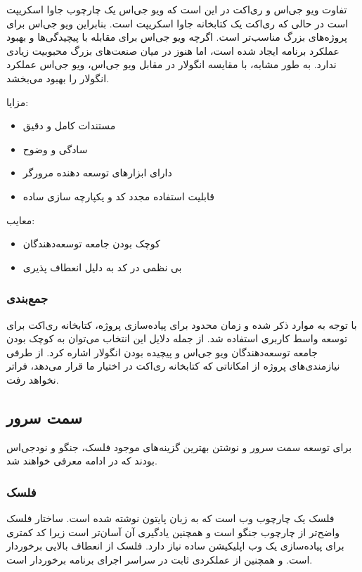 تفاوت ویو جی‌اس و ری‌اکت در این است که ویو جی‌اس یک چارچوب جاوا اسکریپت است در حالی که ری‌اکت یک کتابخانه جاوا اسکریپت است. بنابراین ویو جی‌اس برای پروژه‌های بزرگ مناسب‌تر است. اگرچه ویو جی‌اس برای مقابله با پیچیدگی‌ها و بهبود عملکرد برنامه ایجاد شده است، اما هنوز در میان صنعت‌های بزرگ محبوبیت زیادی ندارد. به طور مشابه، با مقایسه انگولار در مقابل ویو جی‌اس، ویو جی‌اس عملکرد انگولار را بهبود می‌بخشد.


مزایا:
\begin{itemize}
    \item مستندات کامل و دقیق
    \item سادگی و وضوح
    \item دارای ابزارهای توسعه دهنده مرورگر
    \item قابلیت استفاده مجدد کد و یکپارچه سازی ساده
\end{itemize}

معایب:

\begin{itemize}
    \item کوچک بودن جامعه توسعه‌دهندگان
    \item بی نظمی در کد به دلیل انعطاف پذیری 
\end{itemize}


\subsubsection{جمع‌بندی}

با توجه به موارد ذکر شده و زمان محدود برای پیاده‌سازی پروژه، کتابخانه ری‌اکت برای توسعه واسط کاربری استفاده شد. از جمله دلایل این انتخاب می‌توان به کوچک بودن جامعه توسعه‌دهندگان ویو جی‌اس و پیچیده بودن انگولار اشاره کرد. از طرفی نیازمندی‌های پروژه از امکاناتی که کتابخانه ری‌اکت در اختیار ما قرار می‌دهد، فراتر نخواهد رفت.


\subsection{سمت سرور}
برای توسعه سمت سرور و نوشتن  بهترین گزینه‌های موجود فلسک، جنگو و نودجی‌اس بودند که در ادامه معرفی خواهند شد.

\subsubsection{فلسک}
فلسک یک چارچوب وب است که به زبان پایتون نوشته شده است. ساختار فلسک واضح‌تر از چارچوب جنگو است و همچنین یادگیری آن آسان‌تر است زیرا کد کمتری برای پیاده‌سازی یک وب اپلیکیشن ساده نیاز دارد. فلسک از انعطاف بالایی برخوردار است. و همچنین از عملکردی ثابت در سراسر اجرای برنامه برخوردار است.

